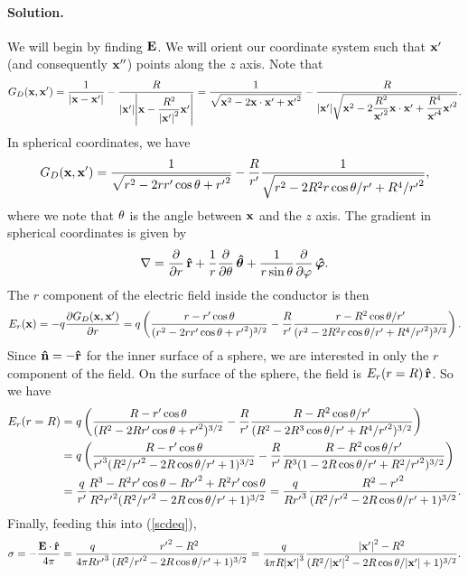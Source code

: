 \documentclass[11pt]{article}
\newcommand{\vfix}{\vspace{-\baselineskip}}
\newcommand{\refeq}[1]{(\ref{#1})}
\newcommand{\beq}{\begin{equation*}}
\newcommand{\eeq}{\end{equation*}}
\newenvironment{solution}
{
    \paragraph{Solution.}
    \ignorespaces
}
{
    \bigskip
}
\begin{document}
\begin{solution}
	We will begin by finding $\mathbf{E}$.  We will orient our coordinate system such that $\mathbf{x}'$ (and consequently $\mathbf{x}''$) points along the $z$ axis.  Note that
	\beq
		\Gdxxp = \frac{1}{\abs{\vx - \vx'}} - \frac{R}{\absxp \abs{\vx - \dfrac{R^2}{\absxp^2} \vx'}}
		= \frac{1}{\sqrt{\vx^2 - 2 \vx \cdot \vx' + {\vx'}^2}} - \frac{R}{\absxp \sqrt{\vx^2 - 2 \dfrac{R^2}{{\vx'}^2} \vx \cdot \vx' + \dfrac{R^4}{{\vx'}^4} {\vx'}^2}}.
	\eeq
	In spherical coordinates, we have
	\beq
		\Gdxxp = \frac{1}{\sqrt{r^2 - 2 r r' \cost + {r'}^2}} - \frac{R}{r'} \frac{1}{\sqrt{r^2 - 2 R^2 r \cost / r' + R^4 / {r'}^2}},
	\eeq
	where we note that $\theta$ is the angle between $\mathbf{x}$ and the $z$ axis.  The gradient in spherical coordinates is given by
	\beq
		\nabla = \pdv{}{r} \,\rh + \frac{1}{r} \pdv{}{\tht} \,\thh + \frac{1}{r \sint} \pdv{}{\vph} \, \phh.
	\eeq
	The $r$ component of the electric field inside the conductor is then
	\beq
		\Er(\vx) = -q \pdv{\Gdxxp}{r}
		= q \left( \frac{r - r' \cost}{(r^2 - 2 r r' \cost + {r'}^2)^{3/2}} - \frac{R}{r'} \frac{r - R^2 \cost / r'}{(r^2 - 2 R^2 r \cost / r' + R^4 / {r'}^2)^{3/2}} \right).
	\eeq
	Since $\mathbf{\hat{n}} = -\mathbf{\hat{r}}$ for the inner surface of a sphere, we are interested in only the $r$ component of the field.  On the surface of the sphere, the field is $E_r(r=R) \,\mathbf{\hat{r}}$.  So we have
	\begin{align*}
		E_r(r=R) &= q \left( \frac{R - r' \cos\theta}{(R^2 - 2 R r' \cos\theta + {r'}^2)^{3/2}} - \frac{R}{r'} \frac{R - R^2 \cos\theta / r'}{(R^2 - 2 R^3 \cos\theta / r' + R^4 / {r'}^2)^{3/2}} \right) \\
		&= q \left( \frac{R - r' \cos\theta}{{r'}^3 (R^2 / {r'}^2 - 2 R \cos\theta / r' + 1)^{3/2}} - \frac{R}{r'} \frac{R - R^2 \cos\theta / r'}{R^3 (1 - 2 R \cos\theta / r' + R^2 / {r'}^2)^{3/2}} \right) \\
		&= \frac{q}{r'} \frac{R^3 - R^2 r' \cos\theta - R {r'}^2 + R^2 r' \cos\theta}{R^2 {r'}^2 (R^2 / {r'}^2 - 2 R \cos\theta / r' + 1)^{3/2}}
		= \frac{q}{R {r'}^3} \frac{R^2 - {r'}^2}{(R^2 / {r'}^2 - 2 R \cos\theta / r' + 1)^{3/2}}.
	\end{align*}
	Finally, feeding this into \refeq{scdeq},
	\beq
		\sig = -\frac{\vE \cdot \rh}{4\pi}
		= \frac{q}{4\pi R {r'}^3} \frac{{r'}^2 - R^2}{(R^2 / {r'}^2 - 2 R \cost / r' + 1)^{3/2}}
		= \frac{q}{4\pi R \absxp^3} \frac{\absxp^2 - R^2}{(R^2 / \absxp^2 - 2 R \cost / \absxp + 1)^{3/2}}.
	\eeq
\end{solution}
\vfix


\newcommand{\vEo}{\vE_0}
\newcommand{\del}{\delta}
\newcommand{\Etht}{E_\tht}
\newcommand{\Fr}{F_r}
\end{document}

